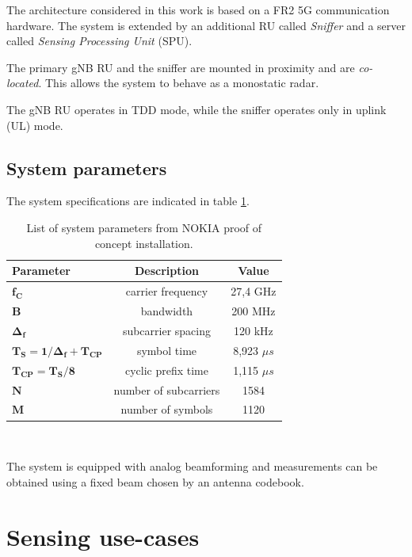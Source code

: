 	The architecture considered in this work is based on a FR2 5G communication hardware. The system is extended by an additional RU called \textit{Sniffer} and a server called \textit{Sensing Processing Unit} (SPU).
	
	The primary gNB RU and the sniffer are mounted in proximity and are \textit{co-located}. This allows the system to behave as a monostatic radar.
	
	The gNB RU operates in TDD mode, while the sniffer operates only in uplink (UL) mode.
	
	\subsection{System parameters}
	
	The system specifications are indicated in table \ref{table:PoCparams}.
	
	\begin{table}[H]
		\centering 
		\begin{tabular}{|p{9em} c c |}
			\hline
			\rowcolor{bluepoli!40} %
			\textbf{Parameter} & \textbf{Description} & \textbf{Value}  \T\B \\
			\hline \hline
			$\bm{f_C}$ & carrier frequency & 27,4 GHz \T\B \\
			$\bm{B}$ & bandwidth & 200 MHz \T\B\\
			$\bm{\Delta_f}$ & subcarrier spacing & 120 kHz  \T\B\\
			$\bm{T_S = 1/\Delta_f + T_{CP}}$ & symbol time & 8,923 $\mu s$  \T\B\\
			$\bm{T_{CP} = T_S/8}$ & cyclic prefix time & 1,115 $\mu s$  \T\B\\
			$\bm{N}$ & number of subcarriers & 1584  \T\B\\
			$\bm{M}$ & number of symbols & 1120  \B\\
			
			\hline
		\end{tabular}
		\\[10pt]
		\caption{List of system parameters from NOKIA proof of concept installation.}
		\label{table:PoCparams}
	\end{table}
	
	The system is equipped with analog beamforming and measurements can be obtained using a fixed beam chosen by an antenna codebook.


\section{Sensing use-cases}

